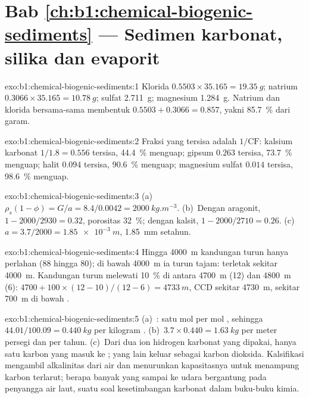 \section*{Bab \ref{ch:b1:chemical-biogenic-sediments} --- Sedimen karbonat, silika dan evaporit}

\begin{solution}{exo:b1:chemical-biogenic-sediments:1}
Klorida $0.5503\times35.165 = \qty{19.35}{g}$; natrium $0.3066\times35.165 =
\qty{10.78}{g}$; sulfat \qty{2.711}{g}; magnesium \qty{1.284}{g}. Natrium dan
klorida bersama-sama membentuk $0.5503 + 0.3066 = 0.857$, yakni \qty{85.7}{\%} dari
garam.
\end{solution}

\begin{solution}{exo:b1:chemical-biogenic-sediments:2}
Fraksi yang tersisa adalah $1/\mathrm{CF}$: kalsium karbonat $1/1.8 = 0.556$ tersisa,
\qty{44.4}{\%} menguap; gipsum $0.263$ tersisa, \qty{73.7}{\%} menguap; halit $0.094$
tersisa, \qty{90.6}{\%} menguap; magnesium sulfat $0.014$ tersisa, \qty{98.6}{\%} menguap.
\end{solution}

\begin{solution}{exo:b1:chemical-biogenic-sediments:3}
(a)~$\rho_s(1-\phi) = G/a = 8.4/0.0042 = \qty{2000}{kg.m^{-3}}$. (b)~Dengan
aragonit, $1 - 2000/2930 = 0.32$, porositas \qty{32}{\%}; dengan kalsit,
$1 - 2000/2710 = 0.26$. (c)~$a = 3.7/2000 = \qty{1.85e-3}{m}$, \qty{1.85}{mm} setahun.
\end{solution}

\begin{solution}{exo:b1:chemical-biogenic-sediments:4}
Hingga \qty{4000}{m} kandungan turun hanya perlahan (88 hingga 80); di bawah
\qty{4000}{m} ia turun tajam:  terletak sekitar \qty{4000}{m}. Kandungan turun
melewati \qty{10}{\%} di antara \qty{4700}{m} (12) dan \qty{4800}{m} (6):
$4700 + 100\times(12-10)/(12-6) = \qty{4733}{m}$, CCD sekitar \qty{4730}{m}, sekitar
\qty{700}{m} di bawah .
\end{solution}

\begin{solution}{exo:b1:chemical-biogenic-sediments:5}
(a)~: satu mol  per mol
, sehingga $44.01/100.09 = \qty{0.440}{kg}$  per kilogram
. (b)~$3.7\times0.440 = \qty{1.63}{kg}$  per meter persegi dan per
tahun. (c)~Dari dua ion hidrogen karbonat yang dipakai, hanya satu karbon yang masuk
ke ; yang lain keluar sebagai karbon dioksida. Kalsifikasi mengambil alkalinitas
dari air dan menurunkan kapasitasnya untuk menampung karbon terlarut; berapa banyak
 yang sampai ke udara bergantung pada penyangga air laut, suatu soal kesetimbangan
karbonat dalam buku-buku kimia.
\end{solution}

